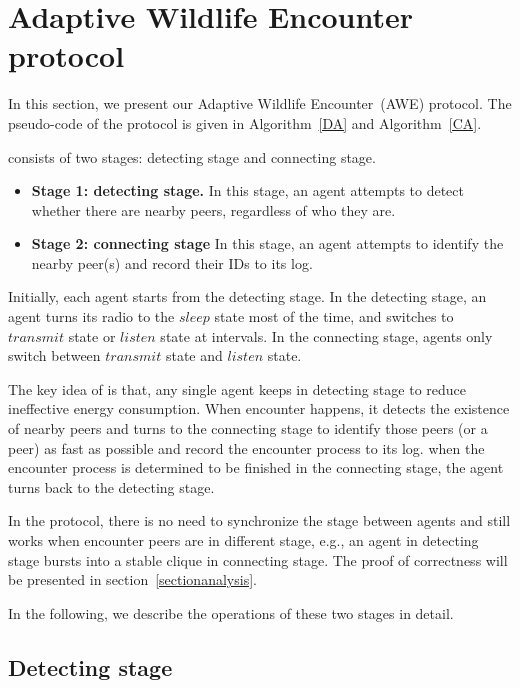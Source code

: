 \section{Adaptive Wildlife Encounter protocol}
\label{sectionprotocol}

In this section, we present our Adaptive Wildlife Encounter~(AWE) protocol.
The pseudo-code of the protocol is given in Algorithm~\ref{DA} and Algorithm~\ref{CA}.

{\pName} consists of two stages: detecting stage and connecting stage. 
\begin{itemize}
    \item \textbf{Stage 1: detecting stage.} In this stage, an agent attempts to
    detect whether there are nearby peers, regardless of who they are. 
    \item \textbf{Stage 2: connecting stage} In this stage, an agent attempts to 
    identify the nearby peer(s) and record their IDs to its log.
\end{itemize}

Initially, each agent starts from the detecting stage. 
In the detecting stage, an agent turns its radio to the $sleep$ state most of the time,
and switches to $transmit$ state or $listen$ state at intervals.
In the connecting stage, agents only switch between $transmit$ state 
and $listen$ state.

The key idea of {\pName} is that, any single agent keeps in detecting 
stage to reduce ineffective energy consumption. When encounter happens, 
it detects the existence of nearby peers and turns to the connecting stage 
to identify those peers (or a peer) as fast as possible and record the encounter process to its log. 
when the encounter process is determined to be finished in the connecting stage, 
the agent turns back to the detecting stage.

\begin{remark}
    In the {\pName} protocol, there is no need to synchronize the stage between agents and
    {\pName} still works when encounter peers are in different stage, e.g., an agent in detecting 
    stage bursts into a stable clique in connecting stage. 
    The proof of correctness will be presented 
    in section~\ref{sectionanalysis}. 
\end{remark}

In the following, we describe the operations of these two stages in detail. 

\subsection{Detecting stage}

